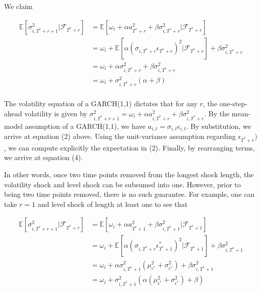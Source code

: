 \documentclass[11pt]{article}
\theoremstyle{definition}
\newenvironment{proof-of-proposition}[1][{}]{\noindent{\bf
    Proof of Proposition {#1}}
  \hspace*{.5em}}{\qed\bigskip\\}
\begin{document}
\begin{proof-of-proposition}
We claim

\begin{align}
\mathbb{E}[ \sigma^{2}_{i,T^{*}+r+1} |\mathcal{F}_{T^{*}+r}] & = \mathbb{E}[\omega_{i} + \alpha a_{T^{*}+r}^{2} + \beta\sigma^{2}_{i,T^{*}+r} |\mathcal{F}_{T^{*}+r}] \\
& = \omega_{i} + \mathbb{E}[\alpha(\sigma_{i,T^{*}+r}\epsilon_{T^{*}+r})^{2} |\mathcal{F}_{T^{*}+r}] + \beta\sigma^{2}_{i,T^{*}+r} \\
& = \omega_{i} + \alpha\sigma_{i,T^{*}+r}^{2} + \beta\sigma^{2}_{i,T^{*}+r} \\
& = \omega_{i} + \sigma^{2}_{i,T^{*}+r}(\alpha + \beta) \\
\end{align}

The volatility equation of a GARCH(1,1) dictates that for any $r$, the one-step-ahead volatility is given by $\sigma^{2}_{i,T^{*}+r+1} = \omega_{i} + \alpha a_{i,T^{*}+r}^{2} + \beta\sigma^{2}_{i,T^{*}+r}$.  By the mean-model assumption of a GARCH(1,1), we have $a_{i,t} = \sigma_{i,t}\epsilon_{i,t}$.  By substitution, we arrive at equation (2) above.  Using the unit-variance assumption regarding $\epsilon_{T^{*}+r})$, we can compute explicitly the expectation in (2).  Finally, by rearranging terms, we arrive at equation (4).
\end{proof-of-proposition}


In other words, once two time points removed from the longest shock length, the volatility shock and level shock can be subsumed into one.  However, prior to being two time points removed, there is no such guarantee.  For example, one can take $r = 1$ and level shock of length at least one to see that 

\begin{align}
\mathbb{E}[ \sigma^{2}_{i,T^{*}+r+1} |\mathcal{F}_{T^{*}+r}] & = \mathbb{E}[\omega_{i} + \alpha a_{T^{*}+1}^{2} + \beta\sigma^{2}_{i,T^{*}+1} |\mathcal{F}_{T^{*}+1}] \\
& = \omega_{i} + \mathbb{E}[\alpha(\sigma_{i,T^{*}+r}\epsilon^{*}_{T^{*}+1})^{2} |\mathcal{F}_{T^{*}+1}] + \beta\sigma^{2}_{i,T^{*}+1} \\
& = \omega_{i} + \alpha\sigma^{2}_{i,T^{*}+1}(\mu^{2}_{\epsilon^{*}} + \sigma^{2}_{\epsilon^{*}}) + \beta\sigma^{2}_{i,T^{*}+1} \\
& = \omega_{i} + \sigma^{2}_{i,T^{*}+1}(\alpha(\mu^{2}_{\epsilon^{*}} + \sigma^{2}_{\epsilon^{*}}) + \beta)
\end{align}
\end{document}

